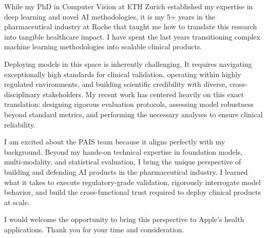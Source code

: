 \documentclass[10pt, letter]{ag-cv} %
\begin{document}
\makecvheader %

\makelettertitlenorec %


\begin{cvletter}






\begin{flushleft}
While my PhD in Computer Vision at ETH Zurich established my expertise in deep learning and novel AI methodologies, it is my 5+ years in the pharmaceutical industry at Roche that taught me how to translate this research into tangible healthcare impact. I have spent the last years transitioning complex machine learning methodologies into scalable clinical products.  

Deploying models in this space is inherently challenging. It requires navigating exceptionally high standards for clinical validation, operating within highly regulated environments, and building scientific credibility with diverse, cross-disciplinary stakeholders. My recent work has centered heavily on this exact translation: designing rigorous evaluation protocols, assessing model robustness beyond standard metrics, and performing the necessary analyses to ensure clinical reliability.  

I am excited about the PAIS team because it aligns perfectly with my background. Beyond my hands-on technical expertise in foundation models, multi-modality, and statistical evaluation, I bring the unique perspective of building and defending AI products in the pharmaceutical industry. I learned what it takes to execute regulatory-grade validation, rigorously interrogate model behavior, and build the cross-functional trust required to deploy clinical products at scale.  

I would welcome the opportunity to bring this perspective to Apple's health applications. Thank you for your time and consideration.
\end{flushleft}

\end{cvletter}


\makeletterclosing %
\end{document}
